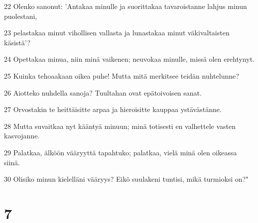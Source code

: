 \par 22 Olenko sanonut: 'Antakaa minulle ja suorittakaa tavaroistanne lahjus minun puolestani,
\par 23 pelastakaa minut vihollisen vallasta ja lunastakaa minut väkivaltaisten käsistä'?
\par 24 Opettakaa minua, niin minä vaikenen; neuvokaa minulle, missä olen erehtynyt.
\par 25 Kuinka tehoaakaan oikea puhe! Mutta mitä merkitsee teidän nuhtelunne?
\par 26 Aiotteko nuhdella sanoja? Tuultahan ovat epätoivoisen sanat.
\par 27 Orvostakin te heittäisitte arpaa ja hieroisitte kauppaa ystävästänne.
\par 28 Mutta suvaitkaa nyt kääntyä minuun; minä totisesti en valhettele vasten kasvojanne.
\par 29 Palatkaa, älköön vääryyttä tapahtuko; palatkaa, vielä minä olen oikeassa siinä.
\par 30 Olisiko minun kielelläni vääryys? Eikö suulakeni tuntisi, mikä turmioksi on?"

\chapter{7}

